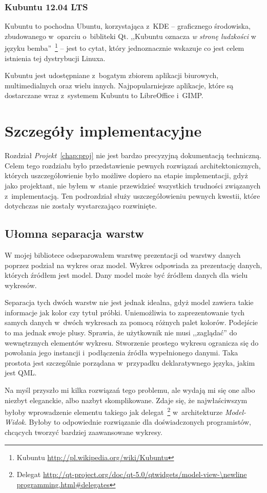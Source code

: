 \subsubsection{Kubuntu 12.04 LTS}
Kubuntu to pochodna Ubuntu, korzystająca z~KDE -- graficznego środowiska, zbudowanego w~oparciu o~bibliteki Qt. ,,Kubuntu oznacza \textit{w stronę ludzkości} w języku bemba''~\footnote{Kubuntu \url{http://pl.wikipedia.org/wiki/Kubuntu}} -- jest to cytat, który jednoznacznie wskazuje co jest celem istnienia tej dystrybucji Linuxa.

Kubuntu jest udostępniane z~bogatym zbiorem aplikacji biurowych, multimedialnych oraz wielu innych. Najpopularniejsze aplikacje, które są dostarczane wraz z~systemem Kubuntu to LibreOffice i~GIMP. 


\section{Szczegóły implementacyjne}
Rozdział \textit{Projekt}~\ref{chap:proj} nie jest bardzo precyzyjną dokumentacją techniczną. Celem tego rozdziału było przedstawienie pewnych rozwiązań architektonicznych, których uszczegółowienie było możliwe dopiero na etapie implementacji, gdyż jako projektant, nie byłem w~stanie przewidzieć wszystkich trudności związanych z~implementacją. Ten podrozdział służy uszczegółowieniu pewnych kwestii, które dotychczas nie zostały wystarczająco rozwinięte.

\subsection{Ułomna separacja warstw}
W mojej bibliotece odseparowałem warstwę prezentacji od warstwy danych poprzez podział na wykres oraz model. Wykres odpowiada za prezentację danych, których źródłem jest model. Dany model może być źródłem danych dla wielu wykresów.

Separacja tych dwóch warstw nie jest jednak idealna, gdyż model zawiera takie informacje jak kolor czy tytuł próbki. Uniemożliwia to zaprezentowanie tych samych danych w~dwóch wykresach za pomocą różnych palet kolorów. Podejście to ma jednak swoje plusy. Sprawia, że użytkownik nie musi ,,zaglądać'' do wewnętrznych elementów wykresu. Stworzenie prostego wykresu ogranicza się do powołania jego instancji i~podłączenia źródła wypełnionego danymi. Taka prostota jest szczególnie porządana w~przypadku deklaratywnego języka, jakim jest QML.

Na myśl przyszło mi kilka rozwiązań tego problemu, ale wydają mi się one albo niezbyt eleganckie, albo nazbyt skomplikowane. Zdaje się, że najwłaściwszym byłoby wprowadzenie elementu takiego jak delegat~\footnote{Delegat \url{http://qt-project.org/doc/qt-5.0/qtwidgets/model-view-\newline programming.html\#delegates}} w~architekturze \textit{Model-Widok}. Byłoby to odpowiednie rozwiązanie dla doświadczonych programistów, chcących tworzyć bardziej zaawansowane wykresy.

